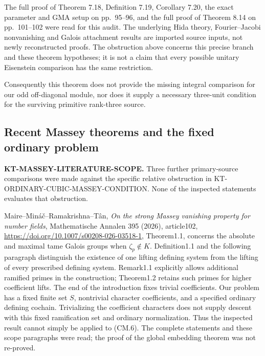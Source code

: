 \documentclass[11pt,a4paper]{article}
\theoremstyle{definition}
\renewcommand{\paragraph}[1]{\par\smallskip\noindent\textbf{#1}\quad\ignorespaces}
\begin{document}
The full proof of Theorem 7.18, Definition 7.19,
Corollary 7.20, the exact parameter and GMA setup on
pp.~95--96, and the full proof of Theorem 8.14 on
pp.~101--102 were read for this audit.  The underlying
Hida theory, Fourier--Jacobi nonvanishing and Galois
attachment results are imported source inputs, not
newly reconstructed proofs.  The obstruction above
concerns this precise branch and these theorem hypotheses;
it is not a claim that every possible unitary Eisenstein
comparison has the same restriction.

Consequently this theorem does not provide the missing
integral comparison for our odd off-diagonal module,
nor does it supply a necessary three-unit condition for
the surviving primitive rank-three source.



\subsection{Recent Massey theorems and the fixed ordinary problem}

\paragraph{KT-MASSEY-LITERATURE-SCOPE.}
Three further primary-source comparisons were made against the
specific relative obstruction in
KT-ORDINARY-CUBIC-MASSEY-CONDITION. None of the inspected statements
evaluates that obstruction.

Maire--Min\'a\v{c}--Ramakrishna--T\^an,
\emph{On the strong Massey vanishing property for number fields},
Mathematische Annalen 395 (2026), article102,
\url{https://doi.org/10.1007/s00208-026-03518-1},
Theorem1.1, concerns the absolute and maximal tame Galois groups
when $\zeta_p\notin K$. Definition1.1 and the following paragraph
distinguish the existence of one lifting defining system from the
lifting of every prescribed defining system. Remark1.1 explicitly
allows additional ramified primes in the construction; Theorem1.2
retains such primes for higher coefficient lifts. The end of the
introduction fixes trivial coefficients. Our problem has a fixed
finite set $S$, nontrivial character coefficients, and a specified
ordinary defining cochain. Trivializing the coefficient characters
does not supply descent with this fixed ramification set and
ordinary normalization.
Thus the inspected result cannot simply be applied to (CM.6).
The complete statements and these scope paragraphs were read;
the proof of the global embedding theorem was not re-proved.
\end{document}

